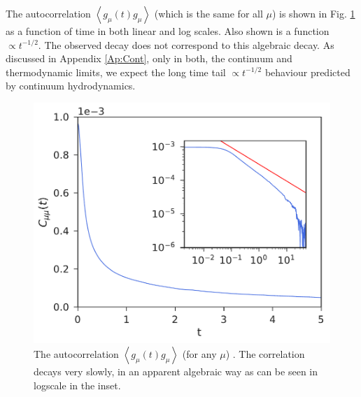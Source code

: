 \documentclass[b5paper,openright,10pt]{book}
\newcommand{\llangle}{\left\langle}
\newcommand{\rrangle}{\right\rangle}
\begin{document}
The autocorrelation $\llangle  g_{\mu}(t) g_\mu\rrangle$ (which is
the same for  all $\mu$) is shown in  Fig.  \ref{fig:Autocorrelation-PBC}
as a function of time in both  linear and log scales.  Also shown is a
function $\propto  t^{-1/2}$.  The observed decay  does not correspond
to this algebraic decay.  As discussed in Appendix \ref{Ap:Cont}, only
in both,  the continuum and  thermodynamic limits, we expect  the long
time  tail   $\propto  t^{-1/2}$  behaviour  predicted   by  continuum
hydrodynamics.

\begin{figure}[h!]
\centering
\includegraphics[scale=0.41]{Ct-mu30nu30-PBC}
\caption[Autocorrelation for an unconfined fluid]{The autocorrelation
  $\llangle g_{\mu}(t) g_\mu\rrangle$ (for  any $\mu$)
  . The correlation  decays very
slowly, in an  apparent algebraic way as can be  seen in logscale in the inset.}
  \label{fig:Autocorrelation-PBC}
\end{figure}
\end{document}
